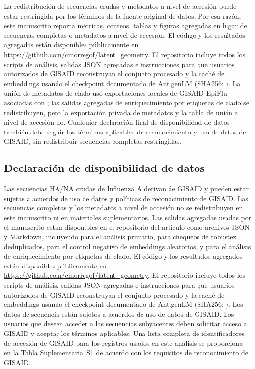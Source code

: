 \documentclass[11pt]{article}
\begin{document}
La redistribución de secuencias crudas y metadatos a nivel de accesión puede estar restringida por los términos de la fuente original de datos. Por esa razón, este manuscrito reporta métricas, conteos, tablas y figuras agregadas en lugar de secuencias completas o metadatos a nivel de accesión. El código y los resultados agregados están disponibles públicamente en \url{https://github.com/cmorregof/latent_geometry}. El repositorio incluye todos los scripts de análisis, salidas JSON agregadas e instrucciones para que usuarios autorizados de GISAID reconstruyan el conjunto procesado y la caché de embeddings usando el checkpoint documentado de AntigenLM (SHA256: ). La unión de metadatos de clado usó exportaciones locales de GISAID EpiFlu asociadas con ; las salidas agregadas de enriquecimiento por etiquetas de clado se redistribuyen, pero la exportación privada de metadatos y la tabla de unión a nivel de accesión no. Cualquier declaración final de disponibilidad de datos también debe seguir los términos aplicables de reconocimiento y uso de datos de GISAID, sin redistribuir secuencias completas restringidas.

\subsection*{Declaración de disponibilidad de datos}

Las secuencias HA/NA crudas de Influenza A derivan de GISAID \cite{shu2017gisaid} y pueden estar sujetas a acuerdos de uso de datos y políticas de reconocimiento de GISAID. Las secuencias completas y los metadatos a nivel de accesión no se redistribuyen en este manuscrito ni en materiales suplementarios. Las salidas agregadas usadas por el manuscrito están disponibles en el repositorio del artículo como archivos JSON y Markdown, incluyendo  para el análisis primario,  para chequeos de robustez deduplicados,  para el control negativo de embeddings aleatorios, y  para el análisis de enriquecimiento por etiquetas de clado. El código y los resultados agregados están disponibles públicamente en \url{https://github.com/cmorregof/latent_geometry}. El repositorio incluye todos los scripts de análisis, salidas JSON agregadas e instrucciones para que usuarios autorizados de GISAID reconstruyan el conjunto procesado y la caché de embeddings usando el checkpoint documentado de AntigenLM (SHA256: ). Los datos de secuencia están sujetos a acuerdos de uso de datos de GISAID. Los usuarios que deseen acceder a las secuencias subyacentes deben solicitar acceso a GISAID y aceptar los términos aplicables. Una lista completa de identificadores de accesión de GISAID para los registros usados en este análisis se proporciona en la Tabla Suplementaria~S1 de acuerdo con los requisitos de reconocimiento de GISAID.
\end{document}
